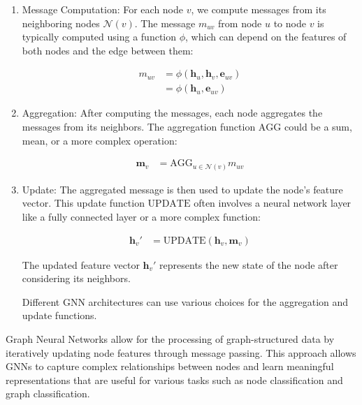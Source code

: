 \begin{enumerate}

\item Message Computation:
  For each node \( v \), we compute messages from its neighboring nodes \( \mathcal{N}(v) \).
  The message \( m_{uv} \) from node \( u \) to node \( v \) is typically computed using a function \( \phi \), which can depend on the features of both nodes and the edge between them:

  \begin{align}
    m_{uv} &= \phi(\mathbf{h}_u, \mathbf{h}_v, \mathbf{e}_{uv}) \\
           &= \phi(\mathbf{h}_u, \mathbf{e}_{uv})
  \end{align}

\item Aggregation:
  After computing the messages, each node aggregates the messages from its neighbors.
  The aggregation function \( \text{AGG} \) could be a sum, mean, or a more complex operation:

  \begin{align}
    \mathbf{m}_v &= \text{AGG}_{u \in \mathcal{N}(v)} m_{uv}
  \end{align}

\item Update:
  The aggregated message is then used to update the node’s feature vector.
  This update function \( \text{UPDATE} \) often involves a neural network layer like a fully connected layer or a more complex function:

  \begin{align}
    \mathbf{h}_v' &= \text{UPDATE}(\mathbf{h}_v, \mathbf{m}_v)
  \end{align}

  The updated feature vector \( \mathbf{h}_v' \) represents the new state of the node after considering its neighbors.

  Different GNN architectures can use various choices for the aggregation and update functions.

\end{enumerate}

Graph Neural Networks allow for the processing of graph-structured data by iteratively updating node features through message passing.
This approach allows GNNs to capture complex relationships between nodes and learn meaningful representations that are useful for various tasks such as node classification and graph classification.